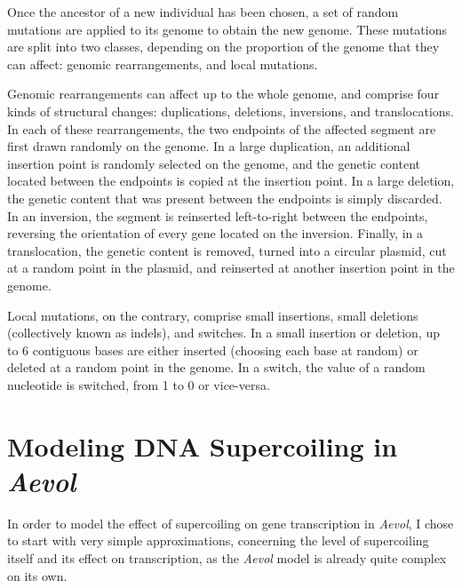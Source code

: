 Once the ancestor of a new individual has been chosen, a set of random mutations are applied to its genome to obtain the new genome.
These mutations are split into two classes, depending on the proportion of the genome that they can affect: genomic rearrangements, and local mutations.

Genomic rearrangements can affect up to the whole genome, and comprise four kinds of structural changes: duplications, deletions, inversions, and translocations.
In each of these rearrangements, the two endpoints of the affected segment are first drawn randomly on the genome.
In a large duplication, an additional insertion point is randomly selected on the genome, and the genetic content located between the endpoints is copied at the insertion point.
In a large deletion, the genetic content that was present between the endpoints is simply discarded.
In an inversion, the segment is reinserted left-to-right between the endpoints, reversing the orientation of every gene located on the inversion.
Finally, in a translocation, the genetic content is removed, turned into a circular plasmid, cut at a random point in the plasmid, and reinserted at another insertion point in the genome.

Local mutations, on the contrary, comprise small insertions, small deletions (collectively known as indels), and switches.
In a small insertion or deletion, up to 6 contiguous bases are either inserted (choosing each base at random) or deleted at a random point in the genome.
In a switch, the value of a random nucleotide is switched, from 1 to 0 or vice-versa.


\section{Modeling DNA Supercoiling in \emph{Aevol}}
\label{sec:aevol:aevol_sc}

In order to model the effect of supercoiling on gene transcription in \emph{Aevol}, I chose to start with very simple approximations,
concerning the level of supercoiling itself and its effect on transcription, as the \emph{Aevol} model is already quite complex on its own.

